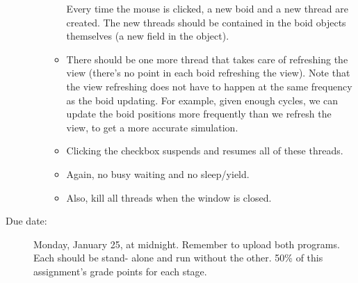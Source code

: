 \documentclass{article}
\begin{document}
\begin{description}
\begin{enumerate}
\begin{itemize}
  Every time the mouse is clicked, a new boid and a new thread are
  created. The new threads should be contained in the boid objects
  themselves (a new field in the object).
\item
  There should be one more thread that takes care of refreshing the
  view (there’s no point in each boid refreshing the view). Note that
  the view refreshing does not have to happen at the same frequency as
  the boid updating. For example, given enough cycles, we can update
  the boid positions more frequently than we refresh the view, to get
  a more accurate simulation.
\item
  Clicking the checkbox suspends and resumes all of these
  threads.
  \item Again, no busy waiting and no sleep/yield.
\item
  Also, kill all
  threads when the window is closed.
  \end{itemize}
  \end{enumerate}


\item[Due date:] Monday, January 25, at
  midnight. Remember to upload both programs. Each should be stand-
  alone and run without the other. 50\% of this assignment's grade
  points for each stage.
  

\end{description}
\end{document}

